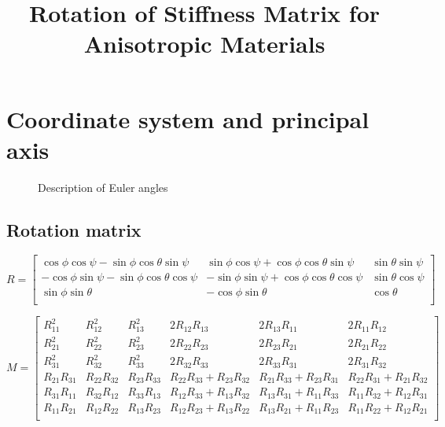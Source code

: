 \documentclass[12pt,a4paper]{article}
\begin{document}
\title{Rotation of Stiffness Matrix for Anisotropic Materials}

\section{Coordinate system and principal axis}

\begin{figure}
	\caption{Description of Euler angles}
	\label{fig:EulerAngles}     
\end{figure}

\subsection{Rotation matrix}

\begin{equation}
\label{eq:RotMat}
R = 
\begin{bmatrix}
  \cos{\phi}\cos{\psi}-\sin{\phi}\cos{\theta}\sin{\psi} & \sin{\phi}\cos{\psi}+\cos{\phi}\cos{\theta}\sin{\psi} & 
  \sin{\theta}\sin{\psi}\\ 
  -\cos{\phi}\sin{\psi} - \sin{\phi}\cos{\theta}\cos{\psi}& 
  -\sin{\phi}\sin{\psi} + \cos{\phi}\cos{\theta}\cos{\psi}& 
  \sin{\theta}\cos{\psi}  \\
  \sin{\phi}\sin{\theta} & 
  -\cos{\phi}\sin{\theta} &
  \cos{\theta} \\ 
\end{bmatrix} 
\end{equation}

\begin{equation}
\label{eq:BondMat}
M = 
\begin{bmatrix}
R_{11}^2 & R_{12}^2 & R_{13}^2 & 2 R_{12} R_{13} & 2 R_{13} R_{11} & 2 R_{11} R_{12} \\ 
R_{21}^2 & R_{22}^2 & R_{23}^2 & 2 R_{22} R_{23} & 2 R_{23} R_{21} & 2 R_{21} R_{22} \\
R_{31}^2 & R_{32}^2 & R_{33}^2 & 2 R_{32} R_{33} & 2 R_{33} R_{31} & 2 R_{31} R_{32} \\
R_{21} R_{31} & R_{22} R_{32} & R_{23} R_{33} & R_{22} R_{33} + R_{23} R_{32} & R_{21} R_{33} + R_{23} R_{31} & R_{22}R_{31} + R_{21} R_{32} \\
R_{31} R_{11} & R_{32} R_{12} & R_{33} R_{13} & R_{12} R_{33} + R_{13} R_{32} & R_{13} R_{31} + R_{11} R_{33} & R_{11}R_{32} + R_{12} R_{31} \\  
R_{11} R_{21} & R_{12} R_{22} & R_{13} R_{23} & R_{12} R_{23} + R_{13} R_{22} & R_{13} R_{21} + R_{11} R_{23} & R_{11}R_{22} + R_{12} R_{21} \\    
\end{bmatrix} 
\end{equation}
\end{document}
